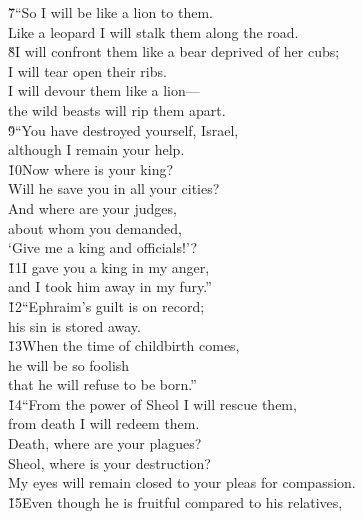 \begin{poetry}
\poeml \v{7}``So I will be like a lion to them. \\
\poemll    Like a leopard I will stalk them along the road. \\
\poeml \v{8}I will confront them like a bear deprived of her cubs; \\
\poemll    I will tear open their ribs. \\
\poeml I will devour them like a lion--- \\
\poemll    the wild beasts will rip them apart. \\
\poeml \v{9}``You have destroyed yourself, Israel, \\
\poemll    although I remain your help. \\
\poeml \v{10}Now where is your king? \\
\poemll    Will he save you in all your cities? \\
\poeml And where are your judges, \\
\poemll    about whom you demanded, \\
\poemlll       `Give me a king and officials!'? \\
\poeml \v{11}I gave you a king in my anger, \\
\poemll    and I took him away in my fury.'' \\
\poeml \v{12}``Ephraim's guilt is on record; \\
\poemll    his sin is stored away. \\
\poeml \v{13}When the time of childbirth comes, \\
\poemll    he will be so foolish \\
\poemlll       that he will refuse to be born.'' \\
\poeml \v{14}``From the power of Sheol I will rescue them, \\
\poemll    from death I will redeem them. \\
\poeml Death, where are your plagues? \\
\poemll    Sheol, where is your destruction? \\
\poemlll       My eyes will remain closed to your pleas for compassion. \\
\poeml \v{15}Even though he is fruitful compared to his relatives, \\

\end{poetry}
